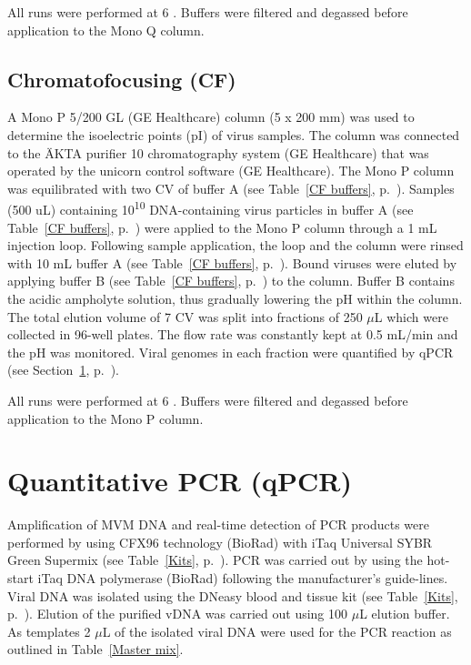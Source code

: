 All runs were performed at 6 \textcelsius. Buffers were filtered and degassed before application to the Mono Q\textsuperscript{\texttrademark} column.



\subsection{Chromatofocusing (CF)}
\label{CF}

A Mono P\textsuperscript{\texttrademark} 5/200 GL (GE Healthcare) column (5 x 200 mm) was used to determine the isoelectric points (pI) of virus samples.  The column was connected to the ÄKTA purifier 10 chromatography system (GE Healthcare) that was operated by the unicorn control software (GE Healthcare). The Mono P\textsuperscript{\texttrademark} column was equilibrated with two CV of buffer A (see Table~\ref{CF buffers}, p.~\pageref{CF buffers}). Samples (500 uL) containing 10\textsuperscript{10} DNA-containing virus particles in buffer A (see Table~\ref{CF buffers}, p.~\pageref{CF buffers}) were applied to the Mono P\textsuperscript{\texttrademark} column through a 1 mL injection loop. Following sample application, the loop and the column were rinsed with 10 mL buffer A (see Table~\ref{CF buffers}, p.~\pageref{CF buffers}). Bound viruses were eluted by applying buffer B (see Table~\ref{CF buffers}, p.~\pageref{CF buffers}) to the column. Buffer B contains the acidic ampholyte solution, thus gradually lowering the pH within the column. The total elution volume of 7 CV was split into fractions of 250 $\mu$L which were collected in 96-well plates. The flow rate was constantly kept at 0.5 mL/min and the pH was monitored. Viral genomes in each fraction were quantified by qPCR (see Section~\ref{qPCR}, p.~\pageref{qPCR}).      

All runs were performed at 6 \textcelsius. Buffers were filtered and degassed before application to the Mono P\textsuperscript{\texttrademark} column.


\section{Quantitative PCR (qPCR)}
\label{qPCR}
Amplification of MVM DNA and real-time detection of PCR products were performed by using CFX96 technology (BioRad) with iTaq\textsuperscript{\texttrademark} Universal SYBR\textsuperscript{\textregistered} Green Supermix (see Table~\ref{Kits}, p.~\pageref{Kits}). PCR was carried out by using the hot-start iTaq\textsuperscript{\texttrademark} DNA polymerase (BioRad) following the manufacturer’s guide-lines. Viral DNA was isolated using the DNeasy blood and tissue kit (see Table~\ref{Kits}, p.~\pageref{Kits}). Elution of the purified vDNA was carried out using 100 $\mu$L elution buffer. As templates 2 $\mu$L of the isolated viral DNA were used for the PCR reaction as outlined in Table~\ref{Master mix}.\\

